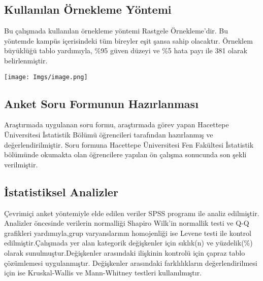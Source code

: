 \documentclass[turkish]{article}
\begin{document}
\subsection{Kullanılan Örnekleme Yöntemi}
Bu çalışmada kullanılan örnekleme yöntemi Rastgele Örnekleme'dir. Bu yöntemde kampüs içerisindeki tüm bireyler eşit şansa sahip olacaktır. Örneklem büyüklüğü tablo yardımıyla, \%95 güven düzeyi ve \%5 hata payı ile 381 olarak belirlenmiştir.   

   \begin{center}
     \centering
    \texttt{[image: Imgs/image.png]}
    \caption{}
    \label{}
 \end{center}

 
\subsection{Anket Soru Formunun Hazırlanması}
Araştırmada uygulanan soru formu, araştırmada görev yapan Hacettepe Üniversitesi İstatistik Bölümü öğrencileri tarafından hazırlanmış ve değerlendirilmiştir. Soru formuna Hacettepe Üniversitesi Fen Fakültesi İstatistik bölümünde okumakta olan öğrencilere yapılan ön çalışma sonucunda son şekli verilmiştir. 

\subsection{İstatistiksel Analizler}
Çevrimiçi anket yöntemiyle elde edilen veriler SPSS programı ile analiz edilmiştir. Analizler öncesinde verilerin normalliği Shapiro Wilk'in normallik testi ve Q-Q grafikleri yardımıyla,grup varyanslarının homojenliği ise Levene testi ile kontrol edilmiştir.Çalışmada yer alan kategorik değişkenler için sıklık(n) ve yüzdelik(\%) olarak sunulmuştur.Değişkenler arasındaki ilişkinin kontrolü için çapraz tablo çözümlemesi uygulanmıştır. Değişkenler arasındaki farklılıkların değerlendirilmesi için ise Kruskal-Wallis ve Mann-Whitney testleri kullanılmıştır.
\end{document}
